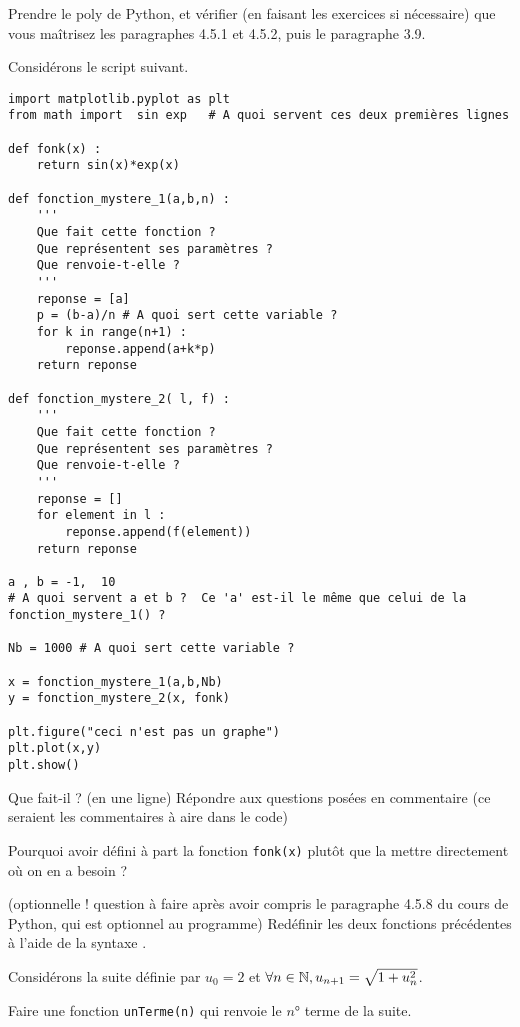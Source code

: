 \exo

\begin{enonce}

\ques Prendre le poly de Python, et vérifier (en faisant les exercices si nécessaire) que vous maîtrisez les paragraphes 4.5.1 et 4.5.2, puis le paragraphe 3.9.

\ques Considérons le script suivant. 
\begin{verbatim}
import matplotlib.pyplot as plt
from math import  sin exp   # A quoi servent ces deux premières lignes

def fonk(x) :
    return sin(x)*exp(x)

def fonction_mystere_1(a,b,n) :
    '''
    Que fait cette fonction ?
    Que représentent ses paramètres ?
    Que renvoie-t-elle ?
    '''
    reponse = [a]
    p = (b-a)/n # A quoi sert cette variable ?
    for k in range(n+1) :
        reponse.append(a+k*p)
    return reponse

def fonction_mystere_2( l, f) :
    '''
    Que fait cette fonction ?
    Que représentent ses paramètres ?
    Que renvoie-t-elle ?
    '''
    reponse = []
    for element in l :
        reponse.append(f(element))
    return reponse

a , b = -1,  10
# A quoi servent a et b ?  Ce 'a' est-il le même que celui de la fonction_mystere_1() ?

Nb = 1000 # A quoi sert cette variable ?

x = fonction_mystere_1(a,b,Nb)
y = fonction_mystere_2(x, fonk)

plt.figure("ceci n'est pas un graphe") 
plt.plot(x,y)
plt.show()
\end{verbatim}
\ssques Que fait-il ? (en une ligne)
\ssques Répondre aux questions posées en commentaire (ce seraient les commentaires à aire dans le code)

\ssques Pourquoi avoir défini à part la fonction \texttt{fonk(x)} plutôt que la mettre directement où on en a besoin ?

\ssques (optionnelle ! question à faire après avoir compris le paragraphe 4.5.8 du cours de Python, qui est optionnel au programme)
Redéfinir les deux fonctions précédentes à l'aide de la syntaxe .

\ques Considérons la suite définie par $u_0=2$ et $\forall n\in\mathbb{N}, u_{n+1}=\sqrt{1+u_n^2}$.

\ssques Faire une fonction \texttt{unTerme(n)} qui renvoie le $n°$ terme de la suite.


\end{enonce}
